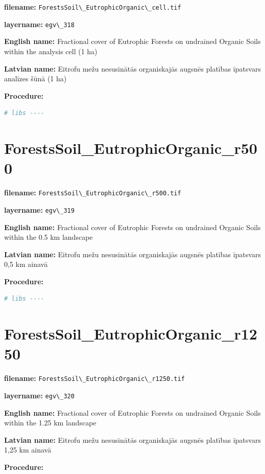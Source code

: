 \documentclass[
]{book}
\newcommand{\passthrough}[1]{#1}
\begin{document}
\textbf{filename:} \passthrough{\lstinline!ForestsSoil\_EutrophicOrganic\_cell.tif!}

\textbf{layername:} \passthrough{\lstinline!egv\_318!}

\textbf{English name:} Fractional cover of Eutrophic Forests on undrained Organic Soils within the analysis cell (1 ha)

\textbf{Latvian name:} Eitrofu mežu nesusinātās organiskajās augsnēs platības īpatsvars analīzes šūnā (1 ha)

\textbf{Procedure:}

\begin{lstlisting}[language=R]
# libs ----
\end{lstlisting}

\section{ForestsSoil\_EutrophicOrganic\_r500}\label{ch06.319}

\textbf{filename:} \passthrough{\lstinline!ForestsSoil\_EutrophicOrganic\_r500.tif!}

\textbf{layername:} \passthrough{\lstinline!egv\_319!}

\textbf{English name:} Fractional cover of Eutrophic Forests on undrained Organic Soils within the 0.5 km landscape

\textbf{Latvian name:} Eitrofu mežu nesusinātās organiskajās augsnēs platības īpatsvars 0,5 km ainavā

\textbf{Procedure:}

\begin{lstlisting}[language=R]
# libs ----
\end{lstlisting}

\section{ForestsSoil\_EutrophicOrganic\_r1250}\label{ch06.320}

\textbf{filename:} \passthrough{\lstinline!ForestsSoil\_EutrophicOrganic\_r1250.tif!}

\textbf{layername:} \passthrough{\lstinline!egv\_320!}

\textbf{English name:} Fractional cover of Eutrophic Forests on undrained Organic Soils within the 1.25 km landscape

\textbf{Latvian name:} Eitrofu mežu nesusinātās organiskajās augsnēs platības īpatsvars 1,25 km ainavā

\textbf{Procedure:}
\end{document}
